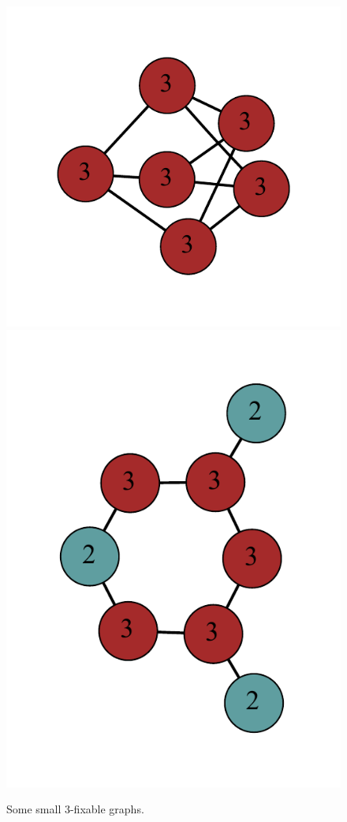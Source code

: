 \documentclass[12pt]{article}
\theoremstyle{plain}
\theoremstyle{definition}
\theoremstyle{remark}
\begin{document}
\begin{figure}[htb]
     	\includegraphics[scale=0.35]{Delta3TriangleFree/001110111111000[3,3,3,3,3,3].pdf}
     	\includegraphics[scale=0.35]{Delta3TriangleFree/0000110000101000110010001000[3,3,3,2,2,2,3,3].pdf}
		\caption{Some small $3$-fixable graphs.}
		\label{fig:small3}
		\end{figure}
\end{document}
